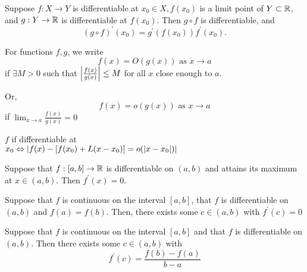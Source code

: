 \documentclass[twoside]{article}
\begin{document}
\begin{theorem}
	Suppose $f : X \to Y$ is differentiable at $x_{0} \in X, f(x_{0})$ is a limit point of $Y \subset \mathbb{R} $, and
	$g : Y \to \mathbb{R} $ is differentiable at $f(x_{0})$. Then $g \circ f $ is differentiable, and
	\begin{equation*}
		(g \circ f )^{\prime}(x_{0}) = g^{\prime}(f(x_{0}))f^{\prime}(x_{0}).
	\end{equation*}
\end{theorem}

\begin{definition}
	For functions $f, g$, we write
	\begin{equation*}
		f(x) = O(g(x)) \text{ as } x \to a
	\end{equation*}
	if $\exists M > 0$ such that $\abs{\frac{f(x)}{g(x)}} \leq M$ for all $x$ close enough to $a $.

	Or,
	\begin{equation*}
		f(x) = o(g(x)) \text{ as } x \to a
	\end{equation*}
	if $\lim_{x \to a }\frac{f(x)}{g(x)} = 0$
\end{definition}

\begin{definition}
	$f $ if differentiable at\\
	$x_{0} \Leftrightarrow \abs{f(x) - [f(x_{0}) + L(x - x_{0})] = o(\abs{x - x_{0}})}$
\end{definition}

\begin{theorem}
	Suppose that $f : [a, b ] \to \mathbb{R} $ is differentiable on $(a,b )$ and attains its maximum at $x \in (a,b )$. Then
	$f^{\prime}(x) = 0$.
\end{theorem}

\begin{theorem}
	Suppose that $f $ is continuous on the interval $[a, b ]$, that $f $ is differentiable on $(a,b )$ and
	$f(a ) = f(b )$. Then, there exists some $c \in (a,b )$ with $f^{\prime }(c) = 0$
\end{theorem}

\begin{theorem}
	Suppose that $f $ is continuous on the interval $[a, b ]$ and that $f $ is differentiable on $(a, b )$.
	Then there exists some $c \in (a, b )$ with
	\begin{equation*}
		f^{\prime}(c) = \frac{f(b) - f(a)}{b - a }
	\end{equation*}
\end{theorem}
\end{document}
